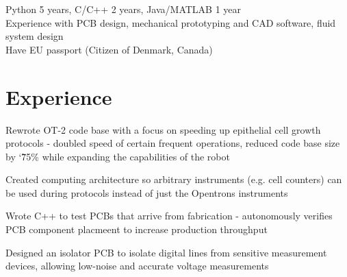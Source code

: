 \documentclass[]{deedy-resume-openfont}
\begin{document}

\begin{minipage}[t]{\textwidth}
	 Python 5 years, C/C++ 2 years, Java/MATLAB 1 year\\
	 Experience with PCB design, mechanical prototyping and CAD software, fluid system design \\
	 Have EU passport (Citizen of Denmark, Canada)
\end{minipage}

\vspace{12pt}

\section{Experience}

\begin{tightemize}
    \item Rewrote OT-2 code base with a focus on speeding up epithelial cell growth protocols - doubled speed of certain frequent operations, reduced code base size by \char`\~ 75\% while expanding the capabilities of the robot
    \item Created computing architecture so arbitrary instruments (e.g. cell counters) can be used during protocols instead of just the Opentrons instruments
\end{tightemize}

\vspace{8pt}

\begin{tightemize}
    \item Wrote C++ to test PCBs that arrive from fabrication - autonomously verifies PCB component placmeent to increase production throughput
    \item Designed an isolator PCB to isolate digital lines from sensitive measurement devices, allowing low-noise and accurate voltage measurements
\end{tightemize}
\end{document}
